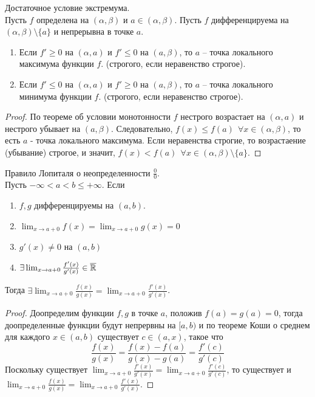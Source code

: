     \begin{corollary}{Достаточное условие экстремума.}\\
        Пусть $f$ определена на $(\alpha, \beta)$ и $a \in (\alpha, \beta)$.
        Пусть $f$ дифференцируема на $(\alpha, \beta) \setminus \{a\}$ и непрерывна в точке $a$.
        \begin{enumerate}
            \item Если $f' \geq 0$ на $(\alpha, a)$ и $f' \leq 0$ на $(a, \beta)$, то $a$ -- точка локального максимума функции $f$.
            (строгого, если неравенство строгое).
            \item Если $f' \leq 0$ на $(\alpha, a)$ и $f' \geq 0$ на $(a, \beta)$, то $a$ -- точка локального минимума функции $f$.
            (строгого, если неравенство строгое).
        \end{enumerate}
    \end{corollary}
    
    \begin{proof}
        По теореме об условии монотонности $f$ нестрого возрастает на $(\alpha, a)$ и нестрого убывает на $(a, \beta)$. Следовательно, $f(x) \leq f(a) \ \ \forall x \in (\alpha, \beta)$, то есть $a$ - точка локального максимума.
        Если неравенства строгие, то возрастаение (убывание) строгое, и значит, $f(x) < f(a) \ \ \forall x \in (\alpha, \beta) \setminus \{a\}$.
    \end{proof}
    
    \begin{theorem}{Правило Лопиталя о неопределенности $\frac{0}{0}$.}\\
        Пусть $-\infty < a < b \leq +\infty$. Если
        \begin{enumerate}
            \item $f, g$ дифференцируемы на $(a, b)$.
            \item $\lim_{x \to a+0} f(x) = \lim_{x \to a+0} g(x) = 0$
            \item $g'(x) \neq 0$ на $(a, b)$
            \item $\exists \lim_{x \to a+0} \frac{f'(x)}{g'(x)} \in \overline{\mathbb{R}}$
        \end{enumerate}
        Тогда $\exists \lim_{x \to a+0} \frac{f(x)}{g(x)} = \lim_{x \to a+0} \frac{f'(x)}{g'(x)}$.
    \end{theorem}
    
    \begin{proof}
        Доопределим функции $f, g$ в точке $a$, положив $f(a) = g(a) = 0$,
        тогда доопределенные функции будут непрервны на $[a, b)$ и по теореме Коши о среднем
        для каждого $x \in (a, b)$ существует $c \in (a, x)$, такое что \[\frac{f(x)}{g(x)} = \frac{f(x)-f(a)}{g(x)-g(a)} = \frac{f'(c)}{g'(c)}\]
        Поскольку существует $\lim_{x \to a + 0} \frac{f'(x)}{g'(x)} = \lim_{x \to a + 0} \frac{f'(c)}{g'(c)}$, то существует и $\lim_{x \to a + 0} \frac{f(x)}{g(x)} = \lim_{x \to a + 0} \frac{f'(x)}{g'(x)}$.
    \end{proof}
    
